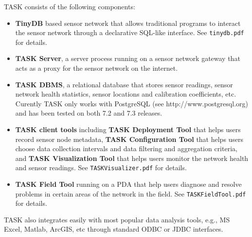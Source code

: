 \documentclass[10pt,letterpaper]{article}
\begin{document}
TASK consists of the following components:
\begin{itemize}
\item {\bf TinyDB} 
based sensor network that allows traditional programs
  to interact the sensor network through a declarative SQL-like interface.
  See {\tt tinydb.pdf} for details.
\item {\bf TASK Server}, a server process running on a sensor network gateway
  that acts as a proxy for the sensor network on the internet.
\item {\bf TASK DBMS}, a relational database that stores sensor readings, sensor
  network health statistics, sensor locations and calibration coefficients, etc.
  Curently TASK only works with PostgreSQL (see http://www.postgresql.org) and
  has been tested on both 7.2 and 7.3 releases.
\item {\bf TASK client tools} including {\bf TASK Deployment Tool} that helps users record
  sensor node metadata, {\bf TASK Configuration Tool} that helps users choose
  data collection intervals and data filtering and aggregation criteria,
  and {\bf TASK Visualization Tool} that helps users monitor the network health
  and sensor readings.  See {\tt TASKVisualizer.pdf} for details.
\item {\bf TASK Field Tool} running on a PDA that help users diagnose
  and resolve problems in certain areas of the network in the field.
  See {\tt TASKFieldTool.pdf} for details.
\end{itemize}
TASK also integrates easily with most popular data analysis tools, e.g.,
MS Excel, Matlab, ArcGIS, etc through standard ODBC or JDBC interfaces.
\end{document}
